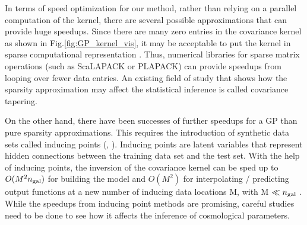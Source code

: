 In terms of speed optimization for our method, rather than relying on 
a parallel computation of the kernel, there are several 
possible approximations that can provide huge speedups. 
Since there are many zero entries in the covariance kernel as shown in
Fig.\ref{fig:GP_kernel_vis}, it may be acceptable to put the kernel in sparse
computational representation \citep{Snelson2007}. 
Thus, numerical libraries for sparse matrix 
operations (such as {\sc ScaLAPACK} or {\sc PLAPACK})
can provide speedups from looping over fewer data entries. 
An existing field of study that shows how the sparsity
approximation may affect the statistical inference is called covariance tapering. 

On the other hand, there have been successes of further speedups for a GP than
pure sparsity approximations. This requires the introduction of  
 synthetic data sets called inducing points (\citealt{Snelson2006},
\citealt{Rasmussen2006}). Inducing points are latent variables that represent
hidden connections between the training data set and the test set. 
With the help 
of inducing points,
the inversion of the covariance kernel can be sped up to
$O(M^2 n_{\rm gal})$ for
building the model and $O(M^2)$ for interpolating / predicting output functions
at a new number of inducing data locations M, with M $\ll n_{\rm gal}$ 
\citep{Snelson2006}. While the speedups from inducing point methods are
promising, careful studies need to be done to see how it affects the
inference of cosmological parameters. 
  
